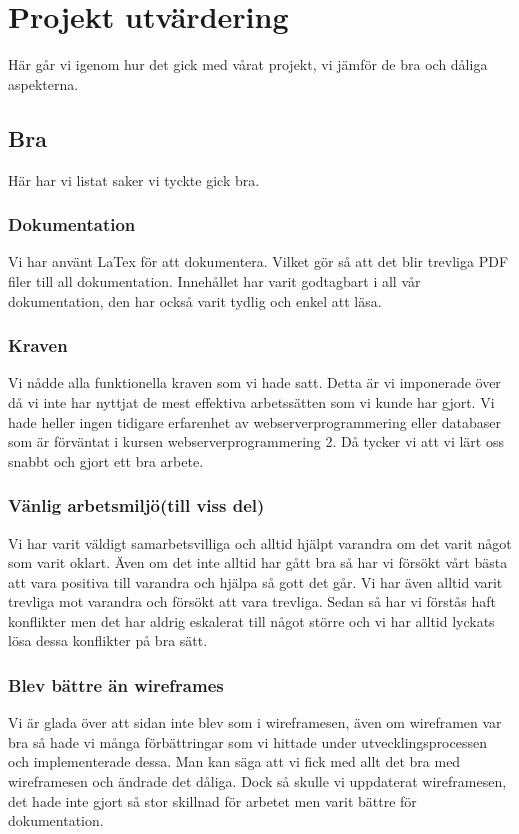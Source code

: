 \documentclass[11pt]{article}					%
\begin{document}
\vspace*{-20pt} %

\section*{Projekt utvärdering}
Här går vi igenom hur det gick med vårat projekt, vi jämför de bra och dåliga aspekterna.
\subsection*{Bra}
Här har vi listat saker vi tyckte gick bra.
\subsubsection*{Dokumentation}
Vi har använt LaTex för att dokumentera. Vilket gör så att det blir trevliga PDF filer till all dokumentation. Innehållet har varit godtagbart i all vår dokumentation, den har också varit tydlig och enkel att läsa.
\subsubsection*{Kraven}
Vi nådde alla funktionella kraven som vi hade satt. Detta är vi imponerade över då vi inte har nyttjat de mest effektiva arbetssätten som vi kunde har gjort. Vi hade heller ingen tidigare erfarenhet av webserverprogrammering eller databaser som är förväntat i kursen webserverprogrammering 2. Då tycker vi att vi lärt oss snabbt och gjort ett bra arbete.
\subsubsection*{Vänlig arbetsmiljö(till viss del)}
Vi har varit väldigt samarbetsvilliga och alltid hjälpt varandra om det varit något som varit oklart. Även om det inte alltid har gått bra så har vi försökt vårt bästa att vara positiva till varandra och hjälpa så gott det går. Vi har även alltid varit trevliga mot varandra och försökt att vara trevliga. Sedan så har vi förstås haft konflikter men det har aldrig eskalerat till något större och vi har alltid lyckats lösa dessa konflikter på bra sätt.
\subsubsection*{Blev bättre än wireframes}
Vi är glada över att sidan inte blev som i wireframesen, även om wireframen var bra så hade vi många förbättringar som vi hittade under utvecklingsprocessen och implementerade dessa. Man kan säga att vi fick med allt det bra med wireframesen och ändrade det dåliga. Dock så skulle vi uppdaterat wireframesen, det hade inte gjort så stor skillnad för arbetet men varit bättre för dokumentation.
\end{document}
